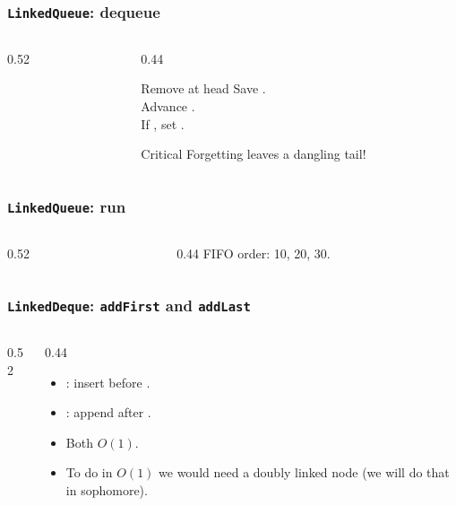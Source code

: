 \documentclass[aspectratio=169,10pt,compress]{beamer}
\begin{document}
\begin{frame}[t,fragile]\frametitle{\texttt{LinkedQueue}: dequeue}
  \begin{columns}[T]
    \begin{column}{0.52\textwidth}
    \end{column}
    \begin{column}{0.44\textwidth}
      \begin{block}{Remove at head}
        \small
        Save .\\
        Advance .\\
        If , set .
      \end{block}
      \begin{block}{Critical}
        \small
        Forgetting  leaves a dangling tail!
      \end{block}
    \end{column}
  \end{columns}
\end{frame}

\begin{frame}[t,fragile]\frametitle{\texttt{LinkedQueue}: run}
  \begin{columns}[T]
    \begin{column}{0.52\textwidth}
    \end{column}
    \begin{column}{0.44\textwidth}
      \small
      FIFO order: 10, 20, 30.
    \end{column}
  \end{columns}
\end{frame}

\begin{frame}[t,fragile]\frametitle{\texttt{LinkedDeque}: \texttt{addFirst} and \texttt{addLast}}
  \begin{columns}[T]
    \begin{column}{0.52\textwidth}
    \end{column}
    \begin{column}{0.44\textwidth}
      \begin{itemize}\small
        \item {}: insert before .
        \item {}: append after .
        \item Both $O(1)$.
        \item To do  in $O(1)$ we would need
              a doubly linked node (we will do that in sophomore).
      \end{itemize}
    \end{column}
  \end{columns}
\end{frame}
\end{document}
